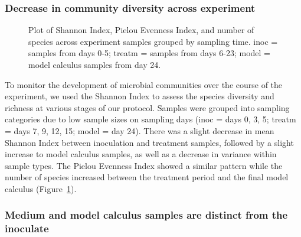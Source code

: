 \documentclass[
  b5paper,
]{book}
\begin{document}
\subsubsection{Decrease in community diversity across
experiment}\label{decrease-in-community-diversity-across-experiment}

\begin{figure}


\caption{\label{fig-diversity-byoc}Plot of Shannon Index, Pielou
Evenness Index, and number of species across experiment samples grouped
by sampling time. inoc = samples from days 0-5; treatm = samples from
days 6-23; model = model calculus samples from day 24.}

\end{figure}%

To monitor the development of microbial communities over the course of
the experiment, we used the Shannon Index to assess the species
diversity and richness at various stages of our protocol. Samples were
grouped into sampling categories due to low sample sizes on sampling
days (inoc = days 0, 3, 5; treatm = days 7, 9, 12, 15; model = day 24).
There was a slight decrease in mean Shannon Index between inoculation
and treatment samples, followed by a slight increase to model calculus
samples, as well as a decrease in variance within sample types. The
Pielou Evenness Index showed a similar pattern while the number of
species increased between the treatment period and the final model
calculus (Figure~\ref{fig-diversity-byoc}).

\subsubsection{Medium and model calculus samples are distinct from the
inoculate}\label{medium-and-model-calculus-samples-are-distinct-from-the-inoculate}
\end{document}

